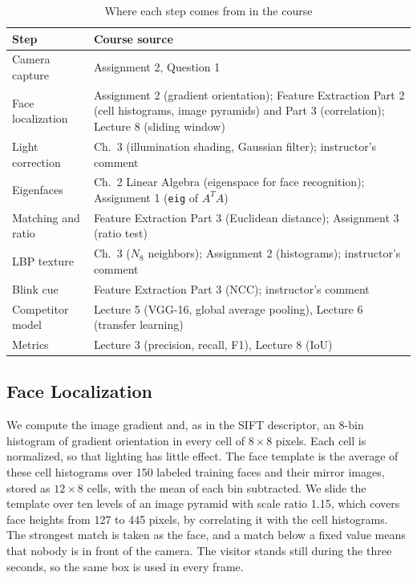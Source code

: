 \documentclass[conference,a4paper]{IEEEtran}
\begin{document}
\begin{table}[t]
\caption{Where each step comes from in the course}
\label{tab:sources}
\centering\footnotesize
\begin{tabular}{@{}p{2.6cm}p{5.3cm}@{}}
\toprule
Step & Course source \\
\midrule
Camera capture & Assignment 2, Question 1 \\
Face localization & Assignment 2 (gradient orientation); Feature Extraction Part 2 (cell histograms, image pyramids) and Part 3 (correlation); Lecture 8 (sliding window) \\
Light correction & Ch.~3 (illumination shading, Gaussian filter); instructor's comment \\
Eigenfaces & Ch.~2 Linear Algebra (eigenspace for face recognition); Assignment 1 (\texttt{eig} of $A^TA$) \\
Matching and ratio & Feature Extraction Part 3 (Euclidean distance); Assignment 3 (ratio test) \\
LBP texture & Ch.~3 ($N_8$ neighbors); Assignment 2 (histograms); instructor's comment \\
Blink cue & Feature Extraction Part 3 (NCC); instructor's comment \\
Competitor model & Lecture 5 (VGG-16, global average pooling), Lecture 6 (transfer learning) \\
Metrics & Lecture 3 (precision, recall, F1), Lecture 8 (IoU) \\
\bottomrule
\end{tabular}
\end{table}

\subsection{Face Localization}
We compute the image gradient and, as in the SIFT descriptor, an 8-bin histogram of gradient orientation in every cell of $8\times8$ pixels. Each cell is normalized, so that lighting has little effect. The face template is the average of these cell histograms over 150 labeled training faces and their mirror images, stored as $12\times8$ cells, with the mean of each bin subtracted. We slide the template over ten levels of an image pyramid with scale ratio 1.15, which covers face heights from 127 to 445 pixels, by correlating it with the cell histograms. The strongest match is taken as the face, and a match below a fixed value means that nobody is in front of the camera. The visitor stands still during the three seconds, so the same box is used in every frame.
\end{document}
